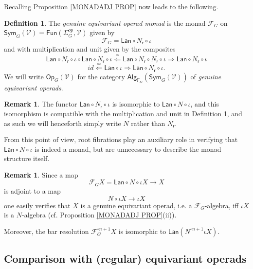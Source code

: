\documentclass[a4paper,10pt
,draft
]{article}%
\numberwithin{equation}{section}
\numberwithin{figure}{section}
\theoremstyle{definition} %
\newtheorem{definition}[equation]{Definition}%
\newtheorem{remark}[equation]{Remark}%
\newcommand{\Op}{\mathsf{Op}}%
\newcommand{\F}{\ensuremath{\mathcal F}}
\newcommand{\V}{\ensuremath{\mathcal V}}
\newcommand{\1}{\ensuremath{\mathbbm 1}}%
\begin{document}
Recalling Proposition \ref{MONADADJ PROP} now leads to the following.
\begin{definition}\label{THEMONAD DEF}
The \textit{genuine equivariant operad monad} is the monad
$\F_G$ on $\mathsf{Sym}_G(\mathcal{V})=\mathsf{Fun}(\Sigma_G^{op}, \mathcal{V})$
given by
\[
	\F_G = \mathsf{Lan} \circ N_{\mathsf{r}} \circ \iota
\]
and with multiplication and unit given by the composites
\[
\mathsf{Lan} \circ N_{\mathsf{r}} \circ \iota \circ
\mathsf{Lan} \circ N_{\mathsf{r}} \circ \iota
\overset{\simeq}{\Leftarrow}
\mathsf{Lan} \circ N_{\mathsf{r}} \circ  N_{\mathsf{r}} \circ \iota
\Rightarrow
\mathsf{Lan} \circ N_{\mathsf{r}} \circ \iota
\]
\[
id \overset{\simeq}{\Leftarrow} \mathsf{Lan} \circ \iota
\Rightarrow
\mathsf{Lan} \circ N_{\mathsf{r}} \circ \iota.
\]
We will write $\Op_G(\V)$ for the category 
$\mathsf{Alg}_{\mathbb{F}_G}(\mathsf{Sym}_G(\mathcal{V}))$ of \textit{genuine equivariant operads}.
\end{definition}

\begin{remark}
	The functor $\mathsf{Lan} \circ N_{\mathsf{r}} \circ \iota$ is isomorphic to 
	$\mathsf{Lan} \circ N \circ \iota$, and this isomorphism is compatible with the multiplication and unit	in Definition \ref{THEMONAD DEF}, and as such we will henceforth simply write $N$ rather than $N_{\mathsf{r}}$.
	
	From this point of view, root fibrations play an auxiliary role in verifying that $\mathsf{Lan} \circ N \circ \iota$ is indeed a monad, but are unnecessary to describe the monad structure itself.
\end{remark}

\begin{remark}\label{REPACKAGERES REM}
Since a map 
\[\F_G X =\mathsf{Lan} \circ N \circ \iota X \to X\]
is adjoint to a map
\[N \circ \iota X \to \iota X \]
one easily verifies that 
$X$ is a genuine equivariant operad, i.e. 
a $\F_G$-algebra, iff 
$\iota X$ is a $N$-algebra
(cf. Proposition \ref{MONADADJ PROP}(ii)).

Moreover, the bar resolution
$ \F_G^{\circ n +1} X $
is isomorphic to
$
	\mathsf{Lan} \left( N^{\circ n +1} \iota X \right)
$.
\end{remark}

\subsection{Comparison with (regular) equivariant operads}
\label{COMPARISON_REGULAR_SECTION}
\end{document}
